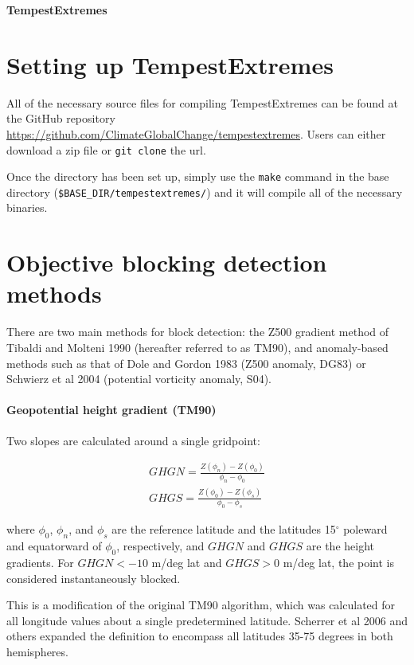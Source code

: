 \documentclass{article}
\begin{document}
{\Huge \textbf{TempestExtremes}}


\tableofcontents

\section{Setting up TempestExtremes}

All of the necessary source files for compiling TempestExtremes can be found at the GitHub repository \url{https://github.com/ClimateGlobalChange/tempestextremes}. Users can either download a zip file or \texttt{git clone} the url. 

Once the directory has been set up, simply use the \texttt{make} command in the base directory (\texttt{\$BASE\_DIR/tempestextremes/}) and it will compile all of the necessary binaries.

\section{Objective blocking detection methods}

There are two main methods for block detection: the Z500 gradient method of Tibaldi and Molteni 1990 (hereafter referred to as TM90), and anomaly-based methods such as that of Dole and Gordon 1983 (Z500 anomaly, DG83) or Schwierz et al 2004 (potential vorticity anomaly, S04). 

\paragraph{Geopotential height gradient (TM90)} Two slopes are calculated around a single gridpoint:

\begin{eqnarray}
GHGN=\frac{Z(\phi_n)-Z(\phi_0)}{\phi_n-\phi_0}\\
GHGS=\frac{Z(\phi_0)-Z(\phi_s)}{\phi_0-\phi_s}
\end{eqnarray}

\noindent where $\phi_0$, $\phi_n$, and $\phi_s$ are the reference latitude and the latitudes 15$^\circ$ poleward and equatorward of $\phi_0$, respectively, and $GHGN$ and $GHGS$ are the height gradients. For $GHGN<-10$ m/deg lat and $GHGS>0$ m/deg lat, the point is considered instantaneously blocked.

This is a modification of the original TM90 algorithm, which was calculated for all longitude values about a single predetermined latitude. Scherrer et al 2006 and others expanded the definition to encompass all latitudes 35-75 degrees in both hemispheres.
\end{document}
